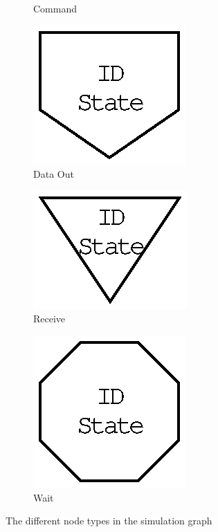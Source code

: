 \begin{figure}
\begin{subfigure}[b]{0.16\textwidth}
        \caption{Command \protect\footnotemark}
        \label{fig:packet_graph_command}
    \end{subfigure}%
    \begin{subfigure}[b]{0.16\textwidth}
        \centering
        \includegraphics[scale=0.45]{evaluation/dot_files/dataout.eps}
        \caption{Data Out}
        \label{fig:packet_graph_dataout}
    \end{subfigure}%
    \begin{subfigure}[b]{0.16\textwidth}
        \centering
        \includegraphics[scale=0.45]{evaluation/dot_files/receive.eps}
        \caption{Receive}
        \label{fig:packet_graph_receive}
    \end{subfigure}%
    \begin{subfigure}[b]{0.16\textwidth}
        \centering
        \includegraphics[scale=0.45]{evaluation/dot_files/wait.eps}
        \caption{Wait}
        \label{fig:packet_graph_wait}
    \end{subfigure}%
    \caption{The different node types in the simulation graph}
    \label{fig:packet_dot_files}
\end{figure}%
